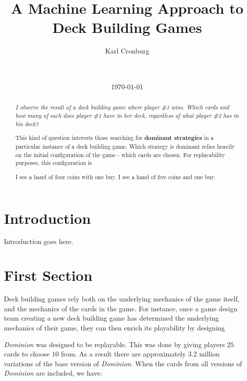 \documentclass{acm_proc_article-sp}
\begin{document}
\title{A Machine Learning Approach to Deck Building Games}

\author{
  \alignauthor
  Karl Cronburg                   \\
   \\
         \\
}
\date{\today}

\maketitle

\begin{abstract}
\emph{I observe the result of a deck building game where player \#1 wins.
Which cards and how many of each does player \#1 have in her deck,
regardless of what player \#2 has in his deck?}

This kind of question interests those searching for {\bf dominant
strategies} in a particular instance of a deck building game.
Which strategy is dominant relies heavily on the initial configuration
of the game - which cards are chosen. For replayability purposes,
this configuration is 
  
I see a hand of four coins with one buy.
I see a hand of five coins and one buy.
\end{abstract}

\section{Introduction}
Introduction goes here.

\section{First Section}

Deck building games rely both on the underlying mechanics of the game itself,
and the mechanics of the cards in the game. For instance, once a game design team
creating a new deck building game has determined the underlying mechanics of
their game, they can then enrich its playability by designing 

\emph{Dominion} was designed to be replayable. This was done by giving players
$25$ cards to choose $10$ from. As a result there are approximately $3.2$
million variations of the base version of \emph{Dominion}. When the cards from
all versions of \emph{Dominion} are included, we have:
\end{document}
